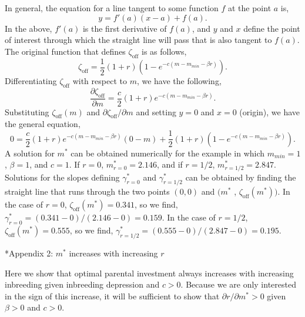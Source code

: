 \documentclass[12pt]{article}
\makeatletter
\renewcommand\section{\@startsection{section}{1}{0in}{-0.5\baselineskip}{0.1\baselineskip}{\normalfont\large\bfseries}}
\makeatother
\begin{document}
In general, the equation for a line tangent to some function $f$ at the point $a$ is,
\begin{equation}
y = f'\left(a\right)\left(x-a\right) + f\left(a\right).
\end{equation}
In the above, $f'(a)$ is the first derivative of $f(a)$, and $y$ and $x$ define the point of interest through which the straight line will pass that is also tangent to $f(a)$. The original function that defines $\zeta_{\textrm{off}}$ is as follows,
\begin{equation}
\zeta_{\textrm{off}} = \frac{1}{2}\left(1+r\right)\left(1-e^{-c\left(m-m_{min}-\beta r\right)}\right).
\end{equation}
Differentiating $\zeta_{\textrm{off}}$ with respect to $m$, we have the following,
\begin{equation}
\frac{\partial \zeta_{\textrm{off}}}{\partial m} = \frac{c}{2} \left(1+r\right)e^{-c\left(m-m_{min}-\beta r\right)}.
\end{equation}
Substituting $\zeta_{\textrm{off}}(m)$ and $\partial \zeta_{\textrm{off}} / \partial m$ and setting $y=0$ and $x=0$ (origin), we have the general equation, 
\begin{equation}
0 = \frac{c}{2} \left(1+r\right)e^{-c\left(m-m_{min}-\beta r\right)}\left(0-m\right) + \frac{1}{2}\left(1+r\right)\left(1-e^{-c\left(m-m_{min}-\beta r\right)}\right).
\end{equation}
A solution for $m^{*}$ can be obtained numerically for the example in which $m_{min}=1$, $\beta=1$, and $c=1$. If $r=0$, $m^{*}_{r=0}=2.146$, and if $r=1/2$, $m^{*}_{r=1/2}=2.847$. Solutions for the slopes defining $\gamma^{*}_{r=0}$ and $\gamma^{*}_{r=1/2}$ can be obtained by finding the straight line that runs through the two points $(0,0)$ and $(m^{*}$ , $\zeta_{\textrm{off}}(m^{*}))$. In the case of $r=0$, $\zeta_{\textrm{off}}(m^{*})=0.341$, so we find, $\gamma^{*}_{r=0}=(0.341 - 0)/(2.146 - 0)=0.159$. In the case of $r=1/2$, $\zeta_{\textrm{off}}(m^{*})=0.555$, so we find, $\gamma^{*}_{r=1/2}=(0.555-0)/(2.847-0)=0.195$. 

\section*{Appendix 2: $m^{*}$ increases with increasing $r$}

Here we show that optimal parental investment always increases with increasing inbreeding given inbreeding depression and $c>0$. Because we are only interested in the sign of this increase, it will be sufficient to show that $\partial r / \partial m^{*} > 0$ given $\beta>0$ and $c>0$. 
\end{document}
